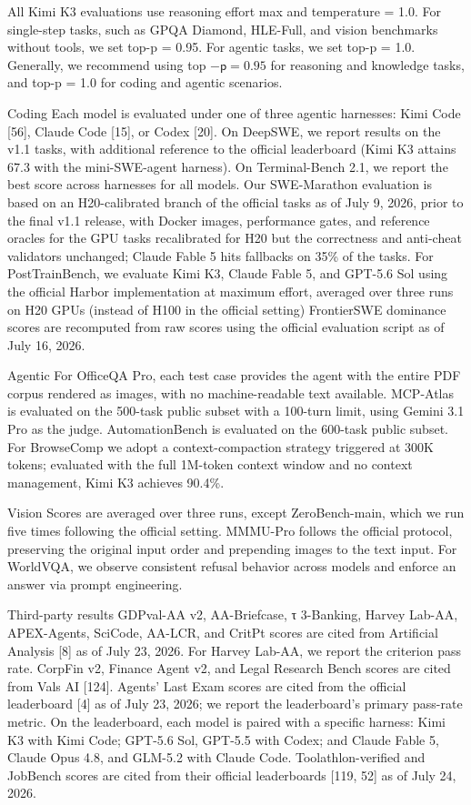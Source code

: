 \documentclass[
  10
]{article}
\begin{document}
All Kimi K3 evaluations use reasoning effort max and temperature = 1.0.
For single-step tasks, such as GPQA Diamond, HLE-Full, and vision
benchmarks without tools, we set top-p = 0.95. For agentic tasks, we set
top-p = 1.0. Generally, we recommend using top
\(- \mathsf { p } = 0 . 9 5\) for reasoning and knowledge tasks, and
top-p = 1.0 for coding and agentic scenarios.

Coding Each model is evaluated under one of three agentic harnesses:
Kimi Code {[}56{]}, Claude Code {[}15{]}, or Codex {[}20{]}. On DeepSWE,
we report results on the v1.1 tasks, with additional reference to the
official leaderboard (Kimi K3 attains 67.3 with the mini-SWE-agent
harness). On Terminal-Bench 2.1, we report the best score across
harnesses for all models. Our SWE-Marathon evaluation is based on an
H20-calibrated branch of the official tasks as of July 9, 2026, prior to
the final v1.1 release, with Docker images, performance gates, and
reference oracles for the GPU tasks recalibrated for H20 but the
correctness and anti-cheat validators unchanged; Claude Fable 5 hits
fallbacks on 35\% of the tasks. For PostTrainBench, we evaluate Kimi K3,
Claude Fable 5, and GPT-5.6 Sol using the official Harbor implementation
at maximum effort, averaged over three runs on H20 GPUs (instead of H100
in the official setting) FrontierSWE dominance scores are recomputed
from raw scores using the official evaluation script as of July 16,
2026.

Agentic For OfficeQA Pro, each test case provides the agent with the
entire PDF corpus rendered as images, with no machine-readable text
available. MCP-Atlas is evaluated on the 500-task public subset with a
100-turn limit, using Gemini 3.1 Pro as the judge. AutomationBench is
evaluated on the 600-task public subset. For BrowseComp we adopt a
context-compaction strategy triggered at 300K tokens; evaluated with the
full 1M-token context window and no context management, Kimi K3 achieves
90.4\%.

Vision Scores are averaged over three runs, except ZeroBench-main, which
we run five times following the official setting. MMMU-Pro follows the
official protocol, preserving the original input order and prepending
images to the text input. For WorldVQA, we observe consistent refusal
behavior across models and enforce an answer via prompt engineering.

Third-party results GDPval-AA v2, AA-Briefcase, τ 3-Banking, Harvey
Lab-AA, APEX-Agents, SciCode, AA-LCR, and CritPt scores are cited from
Artificial Analysis {[}8{]} as of July 23, 2026. For Harvey Lab-AA, we
report the criterion pass rate. CorpFin v2, Finance Agent v2, and Legal
Research Bench scores are cited from Vals AI {[}124{]}. Agents' Last
Exam scores are cited from the official leaderboard {[}4{]} as of July
23, 2026; we report the leaderboard's primary pass-rate metric. On the
leaderboard, each model is paired with a specific harness: Kimi K3 with
Kimi Code; GPT-5.6 Sol, GPT-5.5 with Codex; and Claude Fable 5, Claude
Opus 4.8, and GLM-5.2 with Claude Code. Toolathlon-verified and JobBench
scores are cited from their official leaderboards {[}119, 52{]} as of
July 24, 2026.
\end{document}
